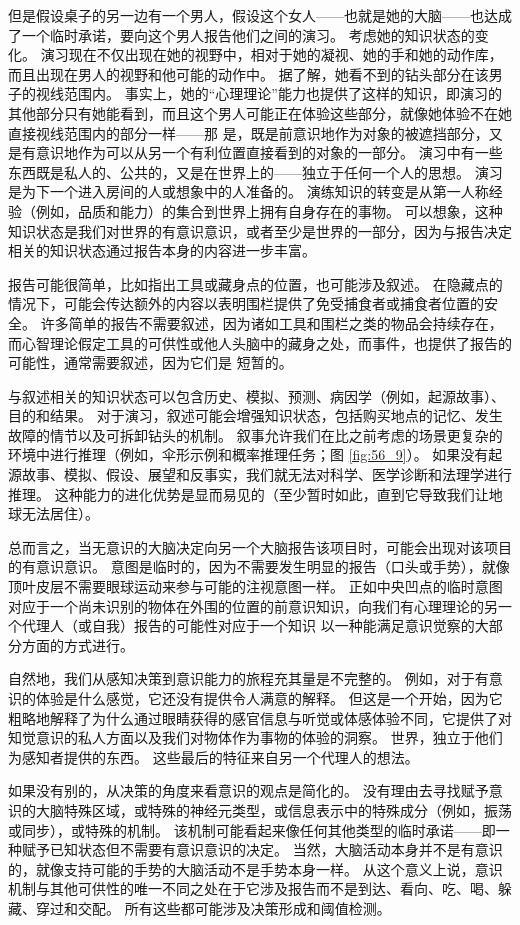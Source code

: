 但是假设桌子的另一边有一个男人，假设这个女人——也就是她的大脑——也达成了一个临时承诺，要向这个男人报告他们之间的演习。
考虑她的知识状态的变化。
演习现在不仅出现在她的视野中，相对于她的凝视、她的手和她的动作库，而且出现在男人的视野和他可能的动作中。
据了解，她看不到的钻头部分在该男子的视线范围内。
事实上，她的“心理理论”能力也提供了这样的知识，即演习的其他部分只有她能看到，而且这个男人可能正在体验这些部分，就像她体验不在她直接视线范围内的部分一样——那 是，既是前意识地作为对象的被遮挡部分，又是有意识地作为可以从另一个有利位置直接看到的对象的一部分。
演习中有一些东西既是私人的、公共的，又是在世界上的——独立于任何一个人的思想。
演习是为下一个进入房间的人或想象中的人准备的。
演练知识的转变是从第一人称经验（例如，品质和能力）的集合到世界上拥有自身存在的事物。
可以想象，这种知识状态是我们对世界的有意识意识，或者至少是世界的一部分，因为与报告决定相关的知识状态通过报告本身的内容进一步丰富。


报告可能很简单，比如指出工具或藏身点的位置，也可能涉及叙述。
在隐藏点的情况下，可能会传达额外的内容以表明围栏提供了免受捕食者或捕食者位置的安全。
许多简单的报告不需要叙述，因为诸如工具和围栏之类的物品会持续存在，而心智理论假定工具的可供性或他人头脑中的藏身之处，而事件，也提供了报告的可能性，通常需要叙述，因为它们是 短暂的。


与叙述相关的知识状态可以包含历史、模拟、预测、病因学（例如，起源故事）、目的和结果。
对于演习，叙述可能会增强知识状态，包括购买地点的记忆、发生故障的情节以及可拆卸钻头的机制。
叙事允许我们在比之前考虑的场景更复杂的环境中进行推理（例如，伞形示例和概率推理任务；图 \ref{fig:56_9}）。
如果没有起源故事、模拟、假设、展望和反事实，我们就无法对科学、医学诊断和法理学进行推理。
这种能力的进化优势是显而易见的（至少暂时如此，直到它导致我们让地球无法居住）。


总而言之，当无意识的大脑决定向另一个大脑报告该项目时，可能会出现对该项目的有意识意识。
意图是临时的，因为不需要发生明显的报告（口头或手势），就像顶叶皮层不需要眼球运动来参与可能的注视意图一样。
正如中央凹点的临时意图对应于一个尚未识别的物体在外围的位置的前意识知识，向我们有心理理论的另一个代理人（或自我）报告的可能性对应于一个知识 以一种能满足意识觉察的大部分方面的方式进行。


自然地，我们从感知决策到意识能力的旅程充其量是不完整的。
例如，对于有意识的体验是什么感觉，它还没有提供令人满意的解释。
但这是一个开始，因为它粗略地解释了为什么通过眼睛获得的感官信息与听觉或体感体验不同，它提供了对知觉意识的私人方面以及我们对物体作为事物的体验的洞察。
世界，独立于他们为感知者提供的东西。
这些最后的特征来自另一个代理人的想法。


如果没有别的，从决策的角度来看意识的观点是简化的。
没有理由去寻找赋予意识的大脑特殊区域，或特殊的神经元类型，或信息表示中的特殊成分（例如，振荡或同步），或特殊的机制。
该机制可能看起来像任何其他类型的临时承诺——即一种赋予已知状态但不需要有意识意识的决定。
当然，大脑活动本身并不是有意识的，就像支持可能的手势的大脑活动不是手势本身一样。
从这个意义上说，意识机制与其他可供性的唯一不同之处在于它涉及报告而不是到达、看向、吃、喝、躲藏、穿过和交配。
所有这些都可能涉及决策形成和阈值检测。


